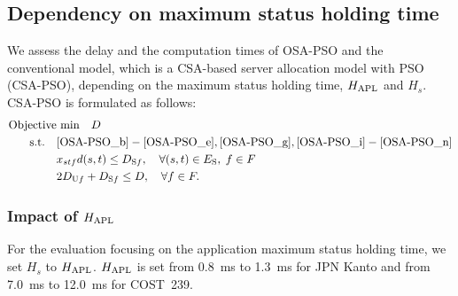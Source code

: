 \documentclass[10pt, letterpaper]{IEEEtran}
\begin{document}
\begin{CJK}{UTF8}{ipxm}
\subsection{Dependency on maximum status holding time}
\label{subsec:Dependency_on_maximum_status_holding_time}

We assess the delay and the computation times of OSA-PSO and the conventional model, which is a CSA-based server allocation model with PSO (CSA-PSO), depending on the maximum status holding time, $H_{\rm APL}$ and $H_s$.
CSA-PSO is formulated as follows:
\begin{subequations} \label{CSA-PSO}
  \begin{align}
  \text{Objective}&\text{ min}\quad D \label{CSA-PSO_a} \\
  \rm{s.t.} \quad
  & \eqref{OSA-PSO_b}-\eqref{OSA-PSO_e}, \eqref{OSA-PSO_g}, \eqref{OSA-PSO_i}-\eqref{OSA-PSO_n} \label{CSA-PSO_b} \\
  &x_{stf}d(s,t) \le D_{\mathrm{S}f}, \quad \forall (s,t) \in E_{\rm{S}}, \; f \in F \label{CSA-PSO_c} \\
  &2D_{\mathrm{U}f} + D_{\mathrm{S}f} \leq D, \quad \forall f \in F. \label{CSA-PSO_d}
  \end{align}
\end{subequations}

\subsubsection{Impact of $H_{\rm APL}$}

For the evaluation focusing on the application maximum status holding time, we set $H_s$ to $H_{\rm APL}$.
$H_{\rm APL}$ is set from 0.8~ms to 1.3~ms for JPN Kanto and from 7.0~ms to 12.0~ms for COST~239.


\end{CJK}
\end{document}

